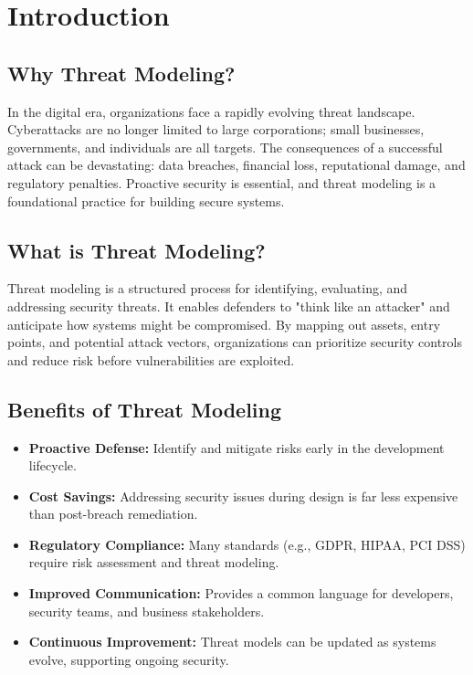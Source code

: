 \section*{Introduction}
\subsection*{Why Threat Modeling?}
In the digital era, organizations face a rapidly evolving threat landscape. Cyberattacks are no longer limited to large corporations; small businesses, governments, and individuals are all targets. The consequences of a successful attack can be devastating: data breaches, financial loss, reputational damage, and regulatory penalties. Proactive security is essential, and threat modeling is a foundational practice for building secure systems.

\subsection*{What is Threat Modeling?}
Threat modeling is a structured process for identifying, evaluating, and addressing security threats. It enables defenders to "think like an attacker" and anticipate how systems might be compromised. By mapping out assets, entry points, and potential attack vectors, organizations can prioritize security controls and reduce risk before vulnerabilities are exploited.

\subsection*{Benefits of Threat Modeling}
\begin{itemize}
	\item \textbf{Proactive Defense:} Identify and mitigate risks early in the development lifecycle.
	\item \textbf{Cost Savings:} Addressing security issues during design is far less expensive than post-breach remediation.
	\item \textbf{Regulatory Compliance:} Many standards (e.g., GDPR, HIPAA, PCI DSS) require risk assessment and threat modeling.
	\item \textbf{Improved Communication:} Provides a common language for developers, security teams, and business stakeholders.
	\item \textbf{Continuous Improvement:} Threat models can be updated as systems evolve, supporting ongoing security.
\end{itemize}

